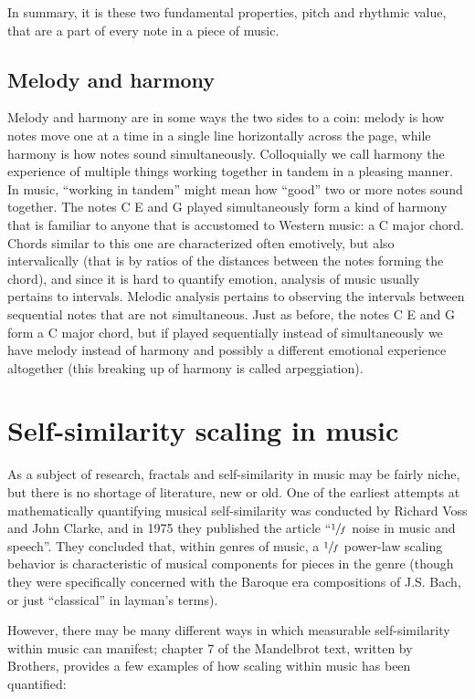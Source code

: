 \documentclass{article}
\begin{document}
In summary, it is these two fundamental properties, pitch and rhythmic value,
that are a part of every note in a piece of music.

\subsection{Melody and harmony}

Melody and harmony are in some ways the two sides to a coin: melody is how notes
move one at a time in a single line horizontally across the page, while harmony
is how notes sound simultaneously. Colloquially we call harmony the experience
of multiple things working together in tandem in a pleasing manner. In music,
“working in tandem” might mean how “good” two or more notes sound together. The
notes C E and G played simultaneously form a kind of harmony that is familiar to
anyone that is accustomed to Western music: a C major chord. Chords similar to
this one are characterized often emotively, but also intervalically (that is by
ratios of the distances between the notes forming the chord), and since it is
hard to quantify emotion, analysis of music usually pertains to intervals.
Melodic analysis pertains to observing the intervals between sequential notes
that are not simultaneous. Just as before, the notes C E and G form a C major
chord, but if played sequentially instead of simultaneously we have melody
instead of harmony and possibly a different emotional experience altogether
(this breaking up of harmony is called arpeggiation).

\section{Self-similarity scaling in music}

As a subject of research, fractals and self-similarity in music may be fairly
niche, but there is no shortage of literature, new or old. One of the earliest
attempts at mathematically quantifying musical self-similarity was conducted by
Richard Voss and John Clarke, and in 1975 they published the article ``$\sfrac 1
f$ noise in music and speech''. They concluded that, within genres of music, a
$\sfrac 1 f$ power-law scaling behavior is characteristic of musical components
for pieces in the genre (though they were specifically concerned with the
Baroque era compositions of J.S. Bach, or just ``classical'' in layman's terms).

However, there may be many different ways in which measurable self-similarity
within music can manifest; chapter 7 of the Mandelbrot text, written by
Brothers, provides a few examples of how scaling within music has been
quantified:
\end{document}
